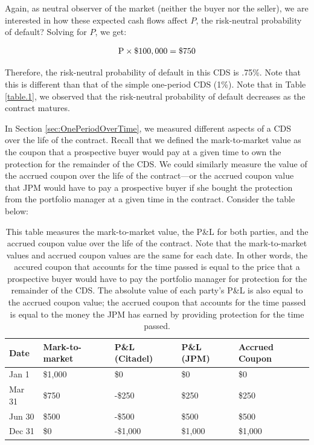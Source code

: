 \documentclass{jss}
\begin{document}
Again, as neutral observer of the market (neither the buyer nor the seller), we are interested in how these expected cash flows affect $P$, the risk-neutral probability of default? Solving for $P$, we get:

\begin{equation}
 \begin{aligned}
   {\rm P \times \$100,000 = \$750}
    \end{aligned}
\end{equation}

Therefore, the risk-neutral probability of default in this CDS is .75\%. Note that this is different than that of the simple one-period CDS (1\%). Note that in Table \ref{table.1}, we observed that the risk-neutral probability of default decreases as the contract matures. 

In Section \ref{sec:OnePeriodOverTime}, we measured different aspects of a CDS over the life of the contract. Recall that we defined the mark-to-market value as the coupon that a prospective buyer would pay at a given time to own the protection for the remainder of the CDS. We could similarly measure the value of the accrued coupon over the life of the contract---or the accrued coupon value that JPM would have to pay a prospective buyer if she bought the protection from the portfolio manager at a given time in the contract. Consider the table below:

\begin{table}[H]
\centering
{\footnotesize
\begin{tabular}{lllll}
  \hline
Date & Mark-to-market & P\&L (Citadel) & P\&L (JPM) & Accrued Coupon \\ 
  \hline
  Jan 1 & \$1,000 & \$0 & \$0 & \$0\\ 
  Mar 31 & \$750 & -\$250 & \$250 & \$250\\ 
  Jun 30 & \$500 & -\$500 & \$500 & \$500\\ 
  Dec 31 & \$0 & -\$1,000 & \$1,000 & \$1,000\\
   \hline
\end{tabular}
}
\caption{This table measures the mark-to-market value, the P\&L for both parties, and the accrued coupon value over the life of the contract. Note that the mark-to-market values and accrued coupon values are the same for each date. In other words, the accured coupon that accounts for the time passed is equal to the price that a prospective buyer would have to pay the portfolio manager for protection for the remainder of the CDS. The absolute value of each party's P\&L is also equal to the accrued coupon value; the accrued coupon that accounts for the time passed is equal to the money the JPM has earned by providing protection for the time passed.}
\end{table}
\end{document}

